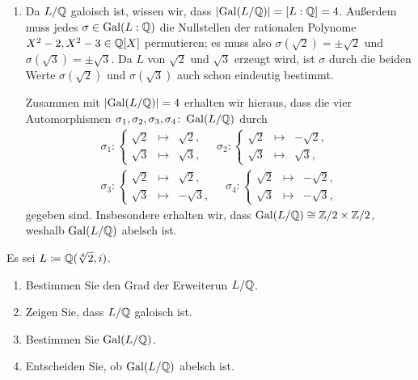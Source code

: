 \begin{solution}
\begin{enumerate}
    \item
      Da $L/\mathbb{Q}$ galoisch ist, wissen wir, dass $|{\operatorname{Gal}(L / \mathbb{Q})}| = [L : \mathbb{Q}] = 4$.
      Außerdem muss jedes $\sigma \in \operatorname{Gal}(L : \mathbb{Q})$ die Nullstellen der rationalen Polynome $X^2 - 2, X^2 - 3 \in \mathbb{Q}[X]$ permutieren;
      es muss also $\sigma(\sqrt{2}) = \pm \sqrt{2}$ und $\sigma(\sqrt{3}) = \pm \sqrt{3}$.
      Da $L$ von $\sqrt{2}$ und $\sqrt{3}$ erzeugt wird, ist $\sigma$ durch die beiden Werte $\sigma(\sqrt{2})$ und $\sigma(\sqrt{3})$ auch schon eindeutig bestimmt.
      
      Zusammen mit $|{\operatorname{Gal}(L / \mathbb{Q})}| = 4$ erhalten wir hieraus, dass die vier Automorphismen $\sigma_1, \sigma_2, \sigma_3, \sigma_4 \colon \operatorname{Gal}(L / \mathbb{Q})$ durch
      \begin{gather*}
        \sigma_1 \colon
        \left\{
          \begin{array}{ccr}
            \sqrt{2} & \mapsto  & \sqrt{2}, \\
            \sqrt{3} & \mapsto  & \sqrt{3},
          \end{array}
        \right.
        \quad
        \sigma_2 \colon
        \left\{
          \begin{array}{ccr}
            \sqrt{2} & \mapsto  & -\sqrt{2},  \\
            \sqrt{3} & \mapsto  &  \sqrt{3},
          \end{array}
        \right.
        \\
        \sigma_3 \colon
        \left\{
          \begin{array}{ccr}
            \sqrt{2} & \mapsto  &  \sqrt{2},  \\
            \sqrt{3} & \mapsto  & -\sqrt{3},
          \end{array}
        \right.
        \quad
        \sigma_4 \colon
        \left\{
          \begin{array}{ccr}
            \sqrt{2} & \mapsto  & -\sqrt{2},  \\
            \sqrt{3} & \mapsto  & -\sqrt{3},
          \end{array}
        \right.
      \end{gather*}
      gegeben sind.
      Insbesondere erhalten wir, dass $\operatorname{Gal}(L / \mathbb{Q}) \cong \mathbb{Z}/2 \times \mathbb{Z}/2$,
      weshalb $\operatorname{Gal}(L / \mathbb{Q})$ abelsch ist.
  \end{enumerate}
\end{solution}


\begin{question}
  Es sei $L \coloneqq \mathbb{Q}(\sqrt[4]{2}, i)$.
  \begin{enumerate}
    \item
      Bestimmen Sie den Grad der Erweiterun $L/\mathbb{Q}$.
    \item
      Zeigen Sie, dass $L/\mathbb{Q}$ galoisch ist.
    \item
      Bestimmen Sie $\operatorname{Gal}(L / \mathbb{Q})$.
    \item
      Entscheiden Sie, ob $\operatorname{Gal}(L / \mathbb{Q})$ abelsch ist.
  \end{enumerate}
\end{question}


